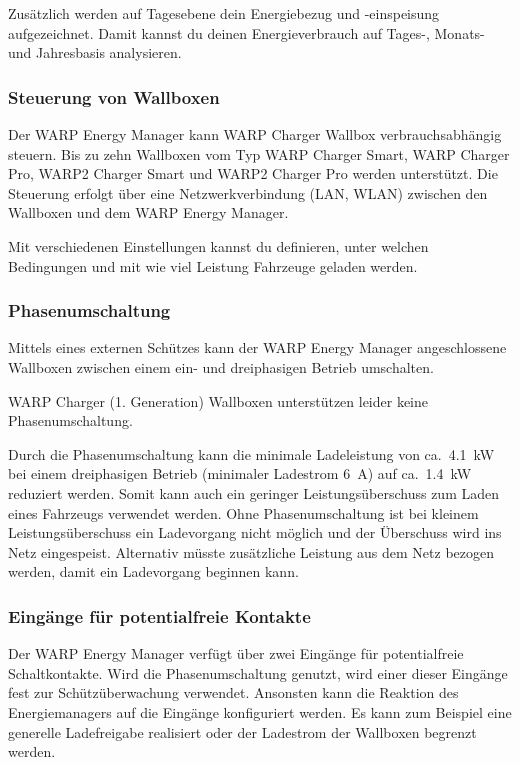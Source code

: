 \documentclass[a4paper,10pt]{article}
\newcommand{\hint}[1]{\begin{tcolorbox}[colback=boxgray,colframe=black,coltext=
white,title=Hinweis,left*=2mm,right*=2mm,boxsep=1mm,bottom=1mm,top=1mm]#1\end{tcolorbox}}
\begin{document}
\begin{multicols*}{2}
	Zusätzlich werden auf Tagesebene dein Energiebezug und -einspeisung
	aufgezeichnet. Damit kannst du deinen Energieverbrauch auf Tages-, Monats- und
	Jahresbasis analysieren.

	\subsubsection{Steuerung von Wallboxen}
	Der WARP Energy Manager kann WARP Charger Wallbox verbrauchsabhängig steuern.
	Bis zu zehn Wallboxen vom Typ WARP Charger Smart,
	WARP Charger Pro, WARP2 Charger Smart und WARP2 Charger Pro werden unterstützt. Die
	Steuerung erfolgt über eine Netzwerkverbindung (LAN, WLAN) zwischen den Wallboxen und dem WARP Energy Manager.

	Mit verschiedenen Einstellungen kannst du definieren,
	unter welchen Bedingungen und mit wie viel Leistung Fahrzeuge geladen werden.

	\subsubsection{Phasenumschaltung}
	Mittels eines externen Schützes kann der WARP Energy Manager
	angeschlossene Wallboxen zwischen einem ein- und dreiphasigen Betrieb
	umschalten.

	\hint{WARP Charger (1. Generation) Wallboxen unterstützen leider keine Phasenumschaltung.}

	Durch die Phasenumschaltung kann die minimale Ladeleistung von
	ca.~\SI{4.1}{\kilo\watt} bei einem dreiphasigen Betrieb (minimaler Ladestrom
	\SI{6}{\ampere}) auf ca.~\SI{1.4}{\kilo\watt} reduziert werden. Somit
	kann auch ein geringer Leistungsüberschuss zum Laden eines Fahrzeugs verwendet werden.
	Ohne Phasenumschaltung ist bei kleinem Leistungsüberschuss ein Ladevorgang nicht möglich
	und der Überschuss wird ins Netz
	eingespeist. Alternativ müsste zusätzliche Leistung aus dem Netz bezogen werden,
	damit ein Ladevorgang beginnen kann.

	\subsubsection{Eingänge für potentialfreie Kontakte}
	Der WARP Energy Manager verfügt über zwei Eingänge für potentialfreie
	Schaltkontakte. Wird die Phasenumschaltung genutzt, wird einer dieser
	Eingänge fest zur Schützüberwachung verwendet. Ansonsten kann die Reaktion
	des Energiemanagers auf die Eingänge konfiguriert werden. Es kann zum
	Beispiel eine generelle Ladefreigabe realisiert oder der
	Ladestrom der Wallboxen begrenzt werden.


\end{multicols*}
\end{document}

